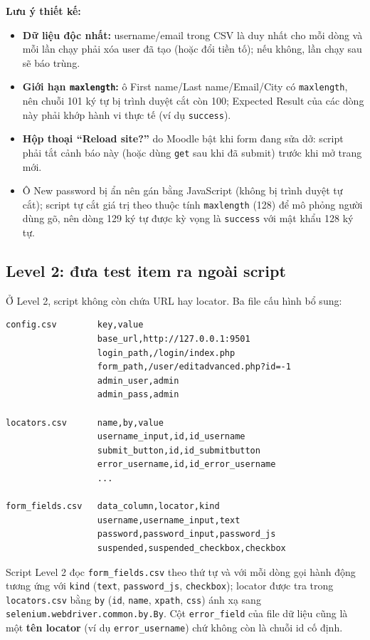 \documentclass[12pt,a4paper]{article}
\begin{document}
\noindent\textbf{Lưu ý thiết kế:}
\begin{itemize}[noitemsep]
  \item \textbf{Dữ liệu độc nhất:} username/email trong CSV là duy nhất cho mỗi dòng và mỗi lần chạy phải xóa user đã tạo (hoặc đổi tiền tố); nếu không, lần chạy sau sẽ báo trùng.
  \item \textbf{Giới hạn \texttt{maxlength}:} ô First name/Last name/Email/City có \texttt{maxlength}, nên chuỗi 101 ký tự bị trình duyệt cắt còn 100; Expected Result của các dòng này phải khớp hành vi thực tế (ví dụ \texttt{success}).
  \item \textbf{Hộp thoại ``Reload site?''} do Moodle bật khi form đang sửa dở: script phải tắt cảnh báo này (hoặc dùng \texttt{get} sau khi đã submit) trước khi mở trang mới.
  \item Ô New password bị ẩn nên gán bằng JavaScript (không bị trình duyệt tự cắt); script tự cắt giá trị theo thuộc tính \texttt{maxlength} (128) để mô phỏng người dùng gõ, nên dòng 129 ký tự được kỳ vọng là \texttt{success} với mật khẩu 128 ký tự.
\end{itemize}

\subsection{Level 2: đưa test item ra ngoài script}
Ở Level 2, script không còn chứa URL hay locator. Ba file cấu hình bổ sung:

\begin{lstlisting}
config.csv        key,value
                  base_url,http://127.0.0.1:9501
                  login_path,/login/index.php
                  form_path,/user/editadvanced.php?id=-1
                  admin_user,admin
                  admin_pass,admin

locators.csv      name,by,value
                  username_input,id,id_username
                  submit_button,id,id_submitbutton
                  error_username,id,id_error_username
                  ...

form_fields.csv   data_column,locator,kind
                  username,username_input,text
                  password,password_input,password_js
                  suspended,suspended_checkbox,checkbox
\end{lstlisting}
Script Level 2 đọc \texttt{form\_fields.csv} theo thứ tự và với mỗi dòng gọi hành động tương ứng với \texttt{kind} (\texttt{text}, \texttt{password\_js}, \texttt{checkbox}); locator được tra trong \texttt{locators.csv} bằng \texttt{by} (\texttt{id}, \texttt{name}, \texttt{xpath}, \texttt{css}) ánh xạ sang \texttt{selenium.webdriver.common.by.By}. Cột \texttt{error\_field} của file dữ liệu cũng là một \textbf{tên locator} (ví dụ \texttt{error\_username}) chứ không còn là chuỗi id cố định.
\end{document}
